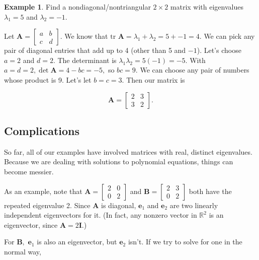 \documentclass[
]{book}
\theoremstyle{definition}
\theoremstyle{definition}
\newtheorem{example}{Example}[chapter]
\theoremstyle{definition}
\theoremstyle{definition}
\theoremstyle{remark}
\begin{document}
\begin{examplebox}

\begin{example}
\protect\hypertarget{exm:ndnt}{}\label{exm:ndnt}Find a nondiagonal/nontriangular \(2\times 2\) matrix with eigenvalues \(\lambda_1=5\) and \(\lambda_2=-1\).

Let \(\mathbf{A}=\begin{bmatrix}a & b\\c& d\end{bmatrix}.\) We know that \(\text{tr }\mathbf{A}=\lambda_1+\lambda_2=5+-1=4.\) We can pick any pair of diagonal entries that add up to 4 (other than 5 and \(-1\)). Let's choose \(a=2\) and \(d=2\). The determinant is \(\lambda_1\lambda_2=5(-1)=-5.\) With \(a=d=2, \det\mathbf{A}=4-bc=-5,\) so \(bc=9.\) We can choose any pair of numbers whose product is 9. Let's let \(b=c=3.\) Then our matrix is

\[\mathbf{A}=\begin{bmatrix}2& 3\\3 & 2\end{bmatrix}.\]
\end{example}

\end{examplebox}

\subsection*{Complications}\label{complications}

So far, all of our examples have involved matrices with real, distinct eigenvalues. Because we are dealing with solutions to polynomial equations, things can become messier.

As an example, note that \(\mathbf{A}=\begin{bmatrix}2 & 0\\0 & 2\end{bmatrix}\) and \(\mathbf{B}=\begin{bmatrix}2 & 3\\0 & 2\end{bmatrix}\) both have the repeated eigenvalue 2. Since \(\mathbf{A}\) is diagonal, \(\mathbf{e}_1\) and \(\mathbf{e}_2\) are two linearly independent eigenvectors for it. (In fact, any nonzero vector in \(\mathbb{R}^2\) is an eigenvector, since \(\mathbf{A}=2\mathbf{I}\).)

For \(\mathbf{B},\) \(\mathbf{e}_1\) is also an eigenvector, but \(\mathbf{e}_2\) isn't. If we try to solve for one in the normal way,
\end{document}
